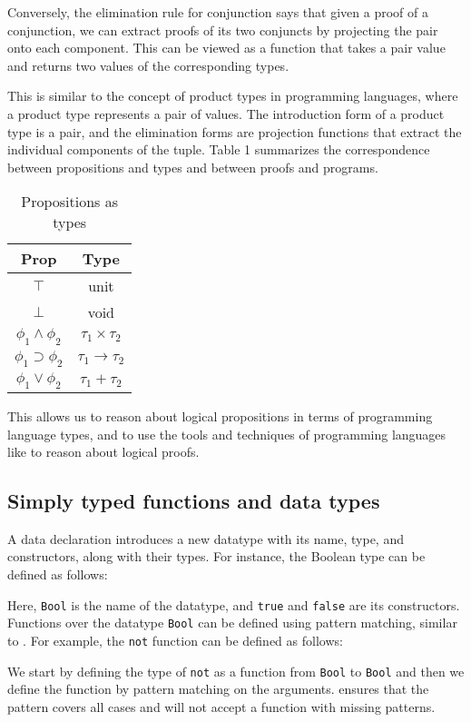\documentclass[titlepage]{article}
\begin{document}
Conversely, the elimination rule for conjunction says that given a proof of a conjunction, we can extract proofs of its two conjuncts by projecting the pair onto each component. This can be viewed as a function that takes a pair value and returns two values of the corresponding types.

This is similar to the concept of product types in programming languages, where a product type represents a pair of values. The introduction form of a product type is a pair, and the elimination forms are projection functions that extract the individual components of the tuple. Table 1 summarizes the correspondence between propositions and types and between proofs and programs.

\begin{table}[h!]
    \centering
    \begin{tabular}{c | c}
        Prop & Type \\
        \hline
        $\top$ & unit \\
        $\bot$ & void \\
        $\phi_1 \wedge \phi_2$ & $\tau_1 \times \tau_2$ \\
        $\phi_1 \supset \phi_2$ & $\tau_1 \to \tau_2$ \\
        $\phi_1 \vee \phi_2$ & $\tau_1 + \tau_2$
    \end{tabular}
    \caption{Propositions as types}
\end{table}

This allows us to reason about logical propositions in terms of programming language types, and to use the tools and techniques of programming languages like \Agda to reason about logical proofs.


\subsection{Simply typed functions and data types}

A data declaration introduces a new datatype with its name, type, and constructors, along with their types. For instance, the Boolean type can be defined as follows:

Here, \texttt{Bool} is the name of the datatype, and \texttt{true} and \texttt{false} are its constructors. Functions over the datatype \texttt{Bool} can be defined using pattern matching, similar to \Haskell. For example, the \texttt{not} function can be defined as follows:

We start by defining the type of \texttt{not} as a function from \texttt{Bool} to \texttt{Bool} and then we define the function by pattern matching on the arguments. \Agda ensures that the pattern covers all cases and will not accept a function with missing patterns.
\end{document}
